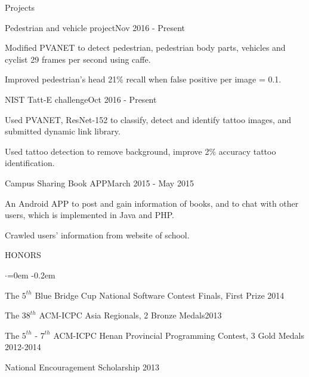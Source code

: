 \documentclass{resume} %
\begin{document}
\begin{rSection}{Projects}


\begin{rSubsection}{Pedestrian and vehicle project}{Nov 2016 - Present}{}{}
\item Modified PVANET to detect pedestrian, pedestrian body parts, vehicles and cyclist 29 frames per second using caffe.
\item Improved pedestrian's head 21\% recall when false positive per image = 0.1.
\end{rSubsection}


\begin{rSubsection}{NIST Tatt-E challenge}{Oct 2016 - Present}{}{}
\item Used PVANET, ResNet-152 to classify, detect and identify tattoo images, and submitted dynamic link library. 
\item Used tattoo detection to remove background, improve 2\% accuracy tattoo identification.
\end{rSubsection}

\begin{rSubsection}{Campus Sharing Book APP}{March 2015 - May 2015}{}{}
\item An Android APP to post and gain information of books, and to chat with other users, which is implemented in Java and PHP.
\item Crawled users' information from website of school.
\end{rSubsection}


\end{rSection}



\begin{rSection}{HONORS}
\begin{list}{$\cdot$}{\leftmargin=0em}
\itemsep -0.2em \vspace{0em}
\item The $5^{th}$ Blue Bridge Cup National Software Contest Finals, First Prize \hfill {2014}
\item The $38^{th}$ ACM-ICPC Asia Regionals, 2 Bronze Medals\hfill {2013}
\item The $5^{th}$ - $7^{th}$ ACM-ICPC Henan Provincial Programming Contest, 3 Gold Medals \hfill {2012-2014}
\item National Encouragement Scholarship \hfill {2013}
\end{list}
\vspace{0.5em}
\end{rSection}
\end{document}
